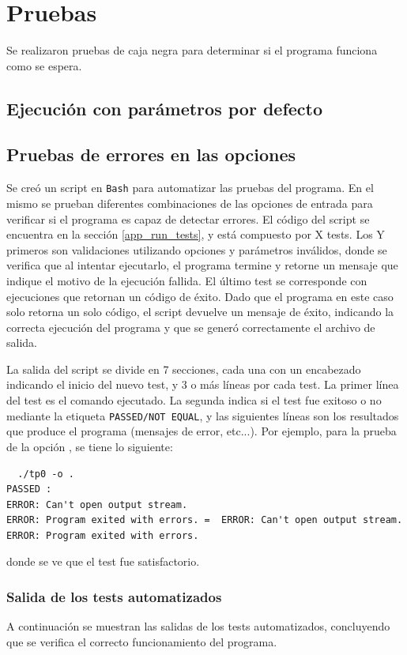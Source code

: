 \clearpage
\section{Pruebas}
Se realizaron pruebas de caja negra para determinar si el programa funciona como se espera.

\subsection{Ejecución con parámetros por defecto}


\subsection{Pruebas de errores en las opciones}

Se creó un script en \texttt{Bash} para automatizar las pruebas del programa. En el mismo se prueban diferentes combinaciones de las opciones de entrada para verificar si el programa es capaz de detectar errores. El código del script se encuentra en la sección \ref{app_run_tests}, y está compuesto por X tests. Los Y primeros son validaciones utilizando opciones y parámetros inválidos, donde se verifica que al intentar ejecutarlo, el programa termine y retorne un mensaje que indique el motivo de la ejecución fallida. El último test se corresponde con ejecuciones que retornan un código de éxito. Dado que el programa en este caso solo retorna un solo código, el script devuelve un mensaje de éxito, indicando la correcta ejecución del programa y que se generó correctamente el archivo de salida.

La salida del script se divide en 7 secciones, cada una con un encabezado indicando el inicio del nuevo test, y 3 o más líneas por cada test. La primer línea del test es el comando ejecutado. La segunda indica si el test fue exitoso o no mediante la etiqueta \texttt{PASSED/NOT EQUAL}, y las siguientes líneas son los resultados que produce el programa (mensajes de error, etc...). Por ejemplo, para la prueba de la opción , se tiene lo siguiente:
\begin{lstlisting}
  ./tp0 -o .
PASSED :
ERROR: Can't open output stream.
ERROR: Program exited with errors. =  ERROR: Can't open output stream.
ERROR: Program exited with errors.
\end{lstlisting}
donde se ve que el test fue satisfactorio.

\subsubsection{Salida de los tests automatizados}
A continuación se muestran las salidas de los tests automatizados, concluyendo que se verifica el correcto funcionamiento del programa.

